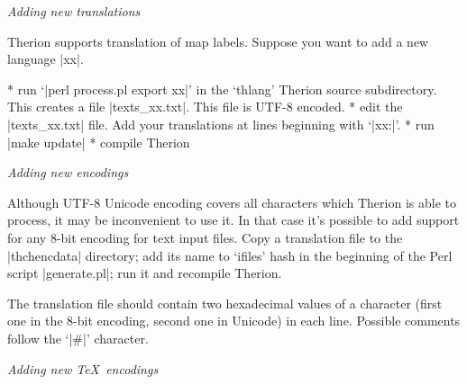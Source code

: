 {\it Adding new translations}

Therion supports translation of map labels. 
Suppose you want to add a new language |xx|. 

\list
* run `|perl process.pl export xx|' in the `thlang' Therion source subdirectory. 
  This creates a file |texts_xx.txt|. This file is UTF-8 encoded.
* edit the |texts_xx.txt| file. Add your translations at lines beginning with
  `|xx:|'.
* run |make update|
* compile Therion
\endlist


{\it Adding new encodings}

Although UTF-8 Unicode encoding covers all characters which Therion is able to 
process, it may be inconvenient to use it. In that case it's possible to add 
support for any 8-bit encoding for text input files. Copy a translation file to 
the |thchencdata| directory; add its name to `ifiles' hash in the beginning of 
the Perl script |generate.pl|; run it and recompile Therion.

The translation file should contain two hexadecimal values of a character 
(first one in the 8-bit encoding, second one in Unicode) in each line. Possible 
comments follow the `|#|' character. 

{\it Adding new \TeX\ encodings}

